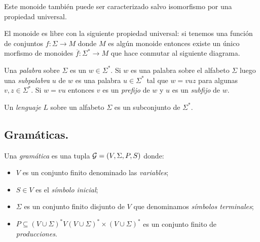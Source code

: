 \documentclass[tesis.tex]{subfiles}
\begin{document}
Este monoide también puede ser caracterizado salvo isomorfismo por una propiedad universal.

\begin{obs}
	El monoide es libre con la siguiente propiedad universal: si tenemos una función de conjuntos $f: \Sigma \to M$ donde $M$ es algún monoide entonces existe un único morfismo de monoides $\overline f: \Sigma^{*} \to M$ que hace conmutar al siguiente diagrama.	
	
	\begin{center}
	\end{center}
	
\end{obs}

Una \emph{palabra} sobre $\Sigma$ es un $w \in \Sigma^*$.
Si $w $ es una palabra sobre el alfabeto $\Sigma$ luego una \emph{subpalabra} $u$ de $w$ es una palabra $u \in \Sigma^*$ tal que $w = vuz$ para algunas $v, z \in \Sigma^*$. 
Si $w = vu$ entonces $v$ es un \emph{prefijo} de $w$ y $u$ es un \emph{subfijo} de $w$.


\begin{deff}
	Un \emph{lenguaje} $L$ sobre un alfabeto $\Sigma$ es un subconjunto de $\Sigma^*$.
\end{deff}




\subsection{Gramáticas.}

\begin{deff}
	Una \emph{gramática} es una tupla ${\cal G} = (V, \Sigma, P, S)$ donde:
	\begin{itemize}
		\item $V$ es un conjunto finito denominado las \emph{variables};
		\item $S \in V$ es el \emph{símbolo inicial};
		\item $\Sigma$ es un conjunto finito disjunto de $V$ que denominamos \emph{símbolos terminales};
		\item $P \subseteq (V \cup \Sigma)^*V(V \cup \Sigma)^* \times (V \cup \Sigma)^*$ es un conjunto finito de \emph{producciones}.
	\end{itemize}
\end{deff}
\end{document}
